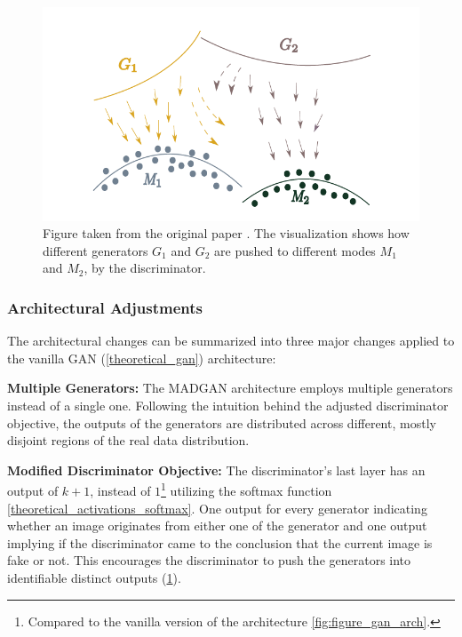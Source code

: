 \begin{figure}[htbp]
    \centering
    \includegraphics[width=.9\textwidth]{abb/madgan_diverse_mode_push.PNG}
    \caption{Figure taken from the original paper \cite{ghosh2018madgan}. The visualization shows how different generators \(G_ {1}\) and \(G_{2}\) are pushed to different modes \(M_{1}\) and \(M_{2}\), by the discriminator.}
    \label{fig:figure_madgan_diverse_mode_push}
\end{figure}

\subsubsection{Architectural Adjustments}
\label{theory_madgan_architecture}
The architectural changes can be summarized into three major changes applied to the vanilla GAN (\ref{theoretical_gan}) architecture:

\noindent\textbf{Multiple Generators:} The MADGAN architecture employs multiple generators instead of a single one. Following the intuition behind the adjusted discriminator objective, the outputs of the generators are distributed across different, mostly disjoint regions of the real data distribution.

\noindent\textbf{Modified Discriminator Objective:} The discriminator's last layer has an output of \(k + 1\), instead of \(1\)\footnote{Compared to the vanilla version of the architecture \ref{fig:figure_gan_arch}.} utilizing the softmax function \ref{theoretical_activations_softmax}. One output for every generator indicating whether an image originates from either one of the generator and one output implying if the discriminator came to the conclusion that the current image is fake or not. This encourages the discriminator to push the generators into identifiable distinct outputs (\ref{fig:figure_madgan_diverse_mode_push}).

